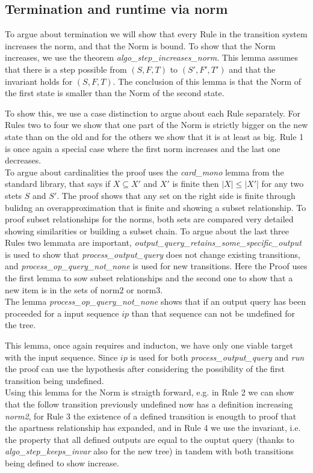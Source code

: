  \subsection{Termination and runtime via norm}
To argue about termination we will show that every Rule in the transition system increases the norm, and that the Norm is bound. To show that the Norm increases, we use the theorem \textit{algo\_step\_increases\_norm}. This lemma assumes that there is a step possible from $(S,F,T)$ to $(S',F',T')$ and that the invariant holds for $(S,F,T)$. The conclusion of this lemma is that the Norm of the first state is smaller than the Norm of the second state. 
\begin{myisabelle}
	\increasesnorm
\end{myisabelle}
To show this, we use a case distinction to argue about each Rule separately. For Rules two to four we show that one part of the Norm is strictly bigger on the new state than on the old and for the others we show that it is at least as big. Rule 1 is once again a special case where the first norm increases and the last one decreases. \\
To argue about cardinalities the proof uses the \textit{card\_mono} lemma from the standard library, that says if $X\subseteq X'$ and $X'$ is finite then $|X|\leq |X'|$ for any two stets $S$ and $S'$. The proof shows that any set on the right side is finite through bulidng an overapproximation that is finite and showing a subset relationship. To proof subset relationships for the norms, both sets are compared very detailed showing similarities or building a subset chain. To argue about the last three Rules two lemmata are important, \textit{output\_query\_retains\_some\_specific\_output} is used to show that \textit{process\_output\_query} does not change existing transitions, and \textit{process\_op\_query\_not\_none} is used for new transitions. Here the Proof uses the first lemma to sow subset relationships and the second one to show that a new item is in the sets of norm2 or norm3. \\
The lemma \textit{process\_op\_query\_not\_none} shows that if an output query has been proceeded for a input sequence $ip$ than that sequence can not be undefined for the tree.
\begin{myisabelle}
	\notnone
\end{myisabelle}
This lemma, once again requires and inducton, we have only one viable target with the input sequence. Since $ip$ is used for both \textit{process\_output\_query} and \textit{run} the proof can use the hypothesis after considering the possibility of the first transition being undefined.\\
Using this lemma for the Norm is straigth forward, e.g. in Rule 2 we can show that the follow transition previously undefined now has a definition increasing \textit{norm2}, for Rule 3 the existence of a defined transition is enougth to proof that the apartness relationship has expanded, and in Rule 4 we use the invariant, i.e. the property that all defined outputs are equal to the ouptut query (thanks to \textit{algo\_step\_keeps\_invar} also for the new tree) in tandem with both transitions being defined to show increase.

